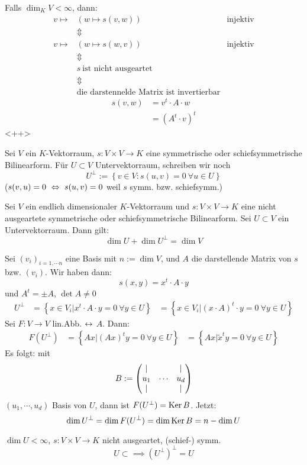 \begin{Bem}
  Falls $\dim_K V <\infty$, dann:
  \begin{align*}
    v\mapsto & \left(w\mapsto s(v,w)\right) & \text{injektiv}\\
    &\Updownarrow \\
    v\mapsto & \left(w\mapsto s(w,v)\right) & \text{injektiv}\\
    &\Updownarrow \\
    &s\ \text{ist nicht ausgeartet}\\
    &\Updownarrow \\
    &\text{die darstennelde Matrix ist invertierbar}
  \end{align*}
  \begin{align*}
    s(v,w) & = v^t\cdot A \cdot w\\
    & = \left( A^t\cdot v \right)^t
  \end{align*}<++>
\end{Bem}
\begin{Sat}
  Sei $V$ ein $K$-Vektorraum, $s:V\times V\to K$ eine symmetrische oder schiefsymmetrische Bilinearform. Für $U\subset V$ Untervektorraum, schreiben wir noch
  \[U^\perp := \left\{ v\in V:s(u,v)=0\ \forall u\in U \right\}\]
  ($s(v,u)=0\ \Leftrightarrow\ s(u,v)=0$ weil $s$ symm. bzw. schiefsymm.)
\end{Sat}
\begin{Prop}
  Sei $V$ ein endlich dimensionaler $K$-Vektorraum und $s:V\times V\to K$ eine nicht ausgeartete symmetrische oder schiefsymmetrische Bilinearform. Sei $U\subset V$ ein Untervektorraum. Dann gilt:
  \[\dim U+\dim U^\perp=\dim V\]
\end{Prop}
\begin{Bew}
  Sei $(v_i)_{i=1,\cdots n}$ eine Basis mit $n:=\dim V$, und $A$ die darstellende Matrix von $s$ bzw. $(v_i)$. Wir haben dann:
  \[s(x,y)=x^t\cdot A \cdot y\]
  und $A^t=\pm A$, $\det A\neq 0$
  \begin{align*}
    U^\perp &= \left\{ x\in V_i| x^t\cdot A \cdot y=0\ \forall y\in U \right\}
    &= \left\{ x\in V_i| (x\cdot A)^t \cdot y=0\ \forall y\in U \right\}
  \end{align*}
  Sei $F:V\to V$ lin.Abb. $\leftrightarrow$ $A$. Dann:
  \begin{align*}
    F(U^\perp) &=\left\{ Ax|(Ax)^ty=0\ \forall y\in U \right\}
    &=\left\{ Ax|\tilde{x}^ty=0\ \forall y\in U \right\}
  \end{align*}
  Es folgt: mit
  \[B:=\begin{pmatrix}| & & |\\ u_1 & \cdots & u_d \\ | & & |\end{pmatrix}\]
  $(u_1,\cdots,u_d)$ Basis von $U$, dann ist $F(U^\perp)=\operatorname{Ker} B$. Jetzt:
  \[\dim U^\perp = \dim F(U^\perp)=\dim \operatorname{Ker} B=n-\dim U\]
\end{Bew}
\begin{Kor}
  $\dim U<\infty$, $s:V\times V\to K$ nicht ausgeartet, (schief-) symm.
  \[U\subset \implies \left( U^\perp \right)^\perp = U\]
\end{Kor}
